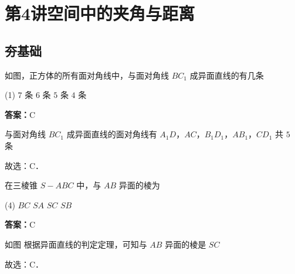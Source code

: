 \section{第4讲\quad 空间中的夹角与距离}
\subsection{夯基础}

\begin{example}[\bkstar{1}{5}]
如图，正方体的所有面对角线中，与面对角线 $BC_1$ 成异面直线的有几条
\begin{tasks}(1)
    \task $7$ 条
    \task $6$ 条
    \task $5$ 条
    \task $4$ 条
\end{tasks}
\end{example}
\begin{solution}
\textbf{答案：}C

与面对角线 $BC_1$ 成异面直线的面对角线有 $A_1D$，$AC$，$B_1D_1$，$AB_1$，$CD_1$ 共 $5$ 条

故选：C．
\end{solution}

\vspace{2em}

\begin{example}[\bkstar{1}{5}]
在三棱锥 $S-ABC$ 中，与 $AB$ 异面的棱为
\begin{tasks}(4)
    \task $BC$
    \task $SA$
    \task $SC$
    \task $SB$
\end{tasks}
\end{example}
\begin{solution}
\textbf{答案：}C

如图
根据异面直线的判定定理，可知与 $AB$ 异面的棱是 $SC$

故选：C．
\end{solution}

\vspace{2em}

